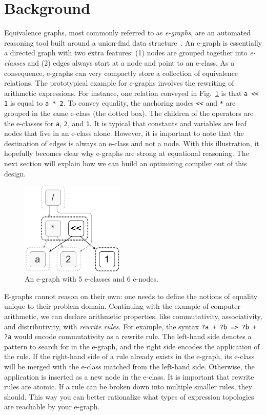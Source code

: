 \documentclass[10pt,letterpaper]{article}
\begin{document}
\section{Background}\label{sec:background}

Equivalence graphs, most commonly referred to as \textit{e-graphs}, are an
automated reasoning tool built around a union-find data
structure~\cite{eggpaper}. An e-graph is essentially a directed graph with two
extra features: (1) nodes are grouped together into \textit{e-classes} and (2)
edges always start at a node and point to an e-class. As a consequence,
e-graphs can very compactly store a collection of equivalence relations. The
prototypical example for e-graphs involves the rewriting of arithmetic
expressions. For instance, one relation conveyed in Fig.~\ref{fig:egraph} is
that \texttt{a << 1} is equal to \texttt{a * 2}. To convey equality, the
anchoring nodes \texttt{<<} and \texttt{*} are grouped in the same e-class (the
dotted box). The children of the operators are the e-classes for \texttt{a},
\texttt{2}, and \texttt{1}. It is typical that constants and variables are leaf
nodes that live in an e-class alone. However, it is important to note that the
destination of edges is always an e-class and not a node. With this
illustration, it hopefully becomes clear why e-graphs are strong at equational
reasoning. The next section will explain how we can build an optimizing
compiler out of this design.

\begin{figure}
    \centering
    \includegraphics[width=0.44\textwidth]{img/egraph.png}
    \caption{An e-graph with 5 e-classes and 6 e-nodes.}\label{fig:egraph}
\end{figure}

E-graphs cannot reason on their own: one needs to define the notions of
equality unique to their problem domain. Continuing with the example of
computer arithmetic, we can declare arithmetic properties, like commutativity,
associativity, and distributivity, with \textit{rewrite rules}. For example,
the syntax \texttt{?a + ?b => ?b + ?a} would encode commutativity as a rewrite
rule. The left-hand side denotes a pattern to search for in the e-graph, and
the right side encodes the application of the rule. If the right-hand side of a
rule already exists in the e-graph, its e-class will be merged with the e-class
matched from the left-hand side. Otherwise, the application is inserted as a
new node in the e-class. It is important that rewrite rules are atomic. If a
rule can be broken down into multiple smaller rules, they should. This way you
can better rationalize what types of expression topologies are reachable by
your e-graph.
\end{document}
